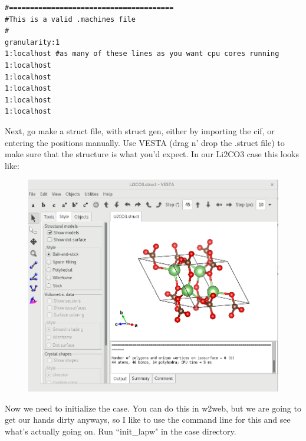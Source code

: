 \documentclass[12pt]{article}
\begin{document}
\begin{lstlisting}
#=======================================
#This is a valid .machines file
#
granularity:1
1:localhost #as many of these lines as you want cpu cores running
1:localhost
1:localhost
1:localhost
1:localhost
1:localhost

\end{lstlisting}

Next, go make a struct file, with struct gen, either by importing the cif, or entering the positions manually.  Use VESTA (drag n' drop the .struct file) to make sure that the structure is what you'd expect. 
In our Li2CO3 case this looks like: 

	\begin{figure}[H]
	\includegraphics[scale=0.4]{./images/Li2CO3_struct.png}
\end{figure}


Now we need to initialize the case.  You can do this in w2web, but we are going to get our hands dirty anyways, so I like to use the command line for this and see what's actually going on.  Run ``init\_lapw" in the case directory.
\end{document}

